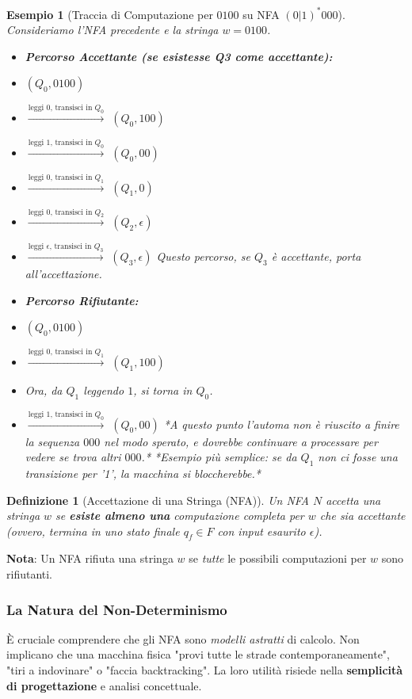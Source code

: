 \documentclass[a4paper]{article}
\newtheorem{definition}{Definizione}[section]
\newtheorem{example}{Esempio}[section]
\begin{document}
\begin{example}[Traccia di Computazione per $0100$ su NFA $(0|1)^*000$]
Consideriamo l'NFA precedente e la stringa $w = 0100$.
\begin{itemize}
    \item \textbf{Percorso Accettante (se esistesse Q3 come accettante):}
    \item $(Q_0, 0100)$
    \item $\xrightarrow{\text{leggi 0, transisci in } Q_0}$ $(Q_0, 100)$
    \item $\xrightarrow{\text{leggi 1, transisci in } Q_0}$ $(Q_0, 00)$
    \item $\xrightarrow{\text{leggi 0, transisci in } Q_1}$ $(Q_1, 0)$
    \item $\xrightarrow{\text{leggi 0, transisci in } Q_2}$ $(Q_2, \epsilon)$
    \item $\xrightarrow{\text{leggi } \epsilon \text{, transisci in } Q_3}$ $(Q_3, \epsilon)$
    Questo percorso, se $Q_3$ è accettante, porta all'accettazione.

    \item \textbf{Percorso Rifiutante:}
    \item $(Q_0, 0100)$
    \item $\xrightarrow{\text{leggi 0, transisci in } Q_1}$ $(Q_1, 100)$
    \item Ora, da $Q_1$ leggendo $1$, si torna in $Q_0$.
    \item $\xrightarrow{\text{leggi 1, transisci in } Q_0}$ $(Q_0, 00)$
    *A questo punto l'automa non è riuscito a finire la sequenza $000$ nel modo sperato, e dovrebbe continuare a processare per vedere se trova altri $000$.*
    *Esempio più semplice: se da $Q_1$ non ci fosse una transizione per '1', la macchina si bloccherebbe.*
\end{itemize}
\end{example}

\begin{definition}[Accettazione di una Stringa (NFA)]
Un NFA $N$ \emph{accetta} una stringa $w$ se \textbf{esiste almeno una} computazione completa per $w$ che sia accettante (ovvero, termina in uno stato finale $q_f \in F$ con input esaurito $\epsilon$).
\end{definition}
\noindent \textbf{Nota}: Un NFA rifiuta una stringa $w$ se \emph{tutte} le possibili computazioni per $w$ sono rifiutanti.

\subsubsection*{La Natura del Non-Determinismo}
È cruciale comprendere che gli NFA sono \emph{modelli astratti} di calcolo. Non implicano che una macchina fisica "provi tutte le strade contemporaneamente", "tiri a indovinare" o "faccia backtracking". La loro utilità risiede nella \textbf{semplicità di progettazione} e analisi concettuale.
\end{document}
